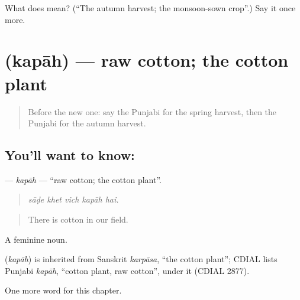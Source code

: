 \begin{tcolorbox}[breakable,colback=teal!4,colframe=teal!35!black,title={Before you move on}]
What does  mean? (\textquotedblleft{}The autumn harvest; the monsoon-sown crop\textquotedblright{}.) Say it once more.
\end{tcolorbox}
\section[\texorpdfstring{\pa{ਕਪਾਹ} (kapāh)}{ਕਪਾਹ (kapāh)}]{ (kapāh) — raw cotton; the cotton plant}

\label{lesson:PA-C300-kapah}



\begin{quote}
Before the new one: say the Punjabi for the spring harvest, then the Punjabi for the autumn harvest.
\end{quote}

\subsection*{You'll want to know: }
\textbf{} — \emph{kapāh} — \textquotedblleft{}raw cotton; the cotton plant\textquotedblright{}.

\begin{quote}
    
\end{quote}

\begin{quote}
\emph{sāḍe khet vich kapāh hai.}
\end{quote}

\begin{quote}
There is cotton in our field.
\end{quote}

A feminine noun.

\begin{cousinweb}
\textbf{} (\emph{kapāh}) is inherited from Sanskrit \emph{karpāsa}, \textquotedblleft{}the cotton plant\textquotedblright{}; CDIAL lists Punjabi \emph{kapāh}, \textquotedblleft{}cotton plant, raw cotton\textquotedblright{}, under it (CDIAL 2877).
\end{cousinweb}

\begin{grammarlens}[title={What you've built}]
One more word for this chapter.
\end{grammarlens}

